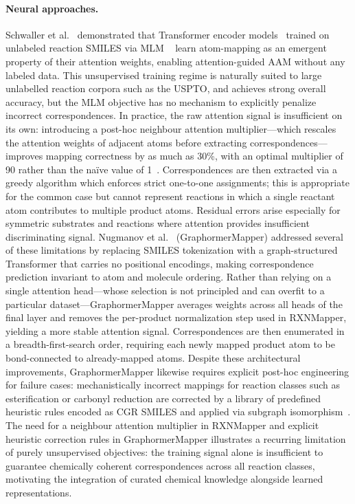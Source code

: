 \documentclass[12pt]{article}
\begin{document}
\paragraph{Neural approaches.}
Schwaller et al.~\cite{Schwaller2021} demonstrated that Transformer
encoder models~\cite{Vaswani2017} trained on unlabeled reaction SMILES via MLM
~\cite{Devlin2019} learn atom-mapping as an emergent property of their
attention weights, enabling attention-guided AAM without any labeled
data.  This unsupervised training regime is naturally suited to large
unlabelled reaction corpora such as the USPTO, and achieves strong
overall accuracy, but the MLM objective has no mechanism to explicitly
penalize incorrect correspondences.  In practice, the raw attention
signal is insufficient on its own: introducing a post-hoc neighbour
attention multiplier---which rescales the attention weights of
adjacent atoms before extracting correspondences---improves mapping
correctness by as much as 30\%, with an optimal multiplier of
90 rather than the na\"{i}ve value of 1~\cite{Schwaller2021}.
Correspondences are then extracted via a greedy algorithm which
enforces strict one-to-one assignments; this is appropriate for the
common case but cannot represent reactions in which a single reactant
atom contributes to multiple product atoms.  Residual errors
arise especially for symmetric substrates and reactions where attention
provides insufficient discriminating signal.  Nugmanov
et al.~\cite{Nugmanov2022} (GraphormerMapper) addressed several of these
limitations by replacing SMILES tokenization with a graph-structured
Transformer that carries no positional encodings, making correspondence
prediction invariant to atom and molecule ordering.  Rather than
relying on a single attention head---whose selection is not principled
and can overfit to a particular dataset---GraphormerMapper averages
weights across all heads of the final layer and removes the per-product
normalization step used in RXNMapper, yielding a more stable attention
signal.  Correspondences are then enumerated in a breadth-first-search
order, requiring each newly mapped product atom to be bond-connected to
already-mapped atoms.  Despite these architectural improvements,
GraphormerMapper likewise requires explicit post-hoc engineering for
failure cases: mechanistically incorrect mappings for reaction classes
such as esterification or carbonyl reduction are corrected by a library
of predefined heuristic rules encoded as CGR SMILES and applied via
subgraph isomorphism~\cite{Nugmanov2022}.  The need for a neighbour
attention multiplier in RXNMapper and explicit heuristic correction rules
in GraphormerMapper illustrates a recurring limitation of purely
unsupervised objectives: the training signal alone is insufficient to
guarantee chemically coherent correspondences across all reaction classes,
motivating the integration of curated chemical knowledge alongside learned
representations.
\end{document}
